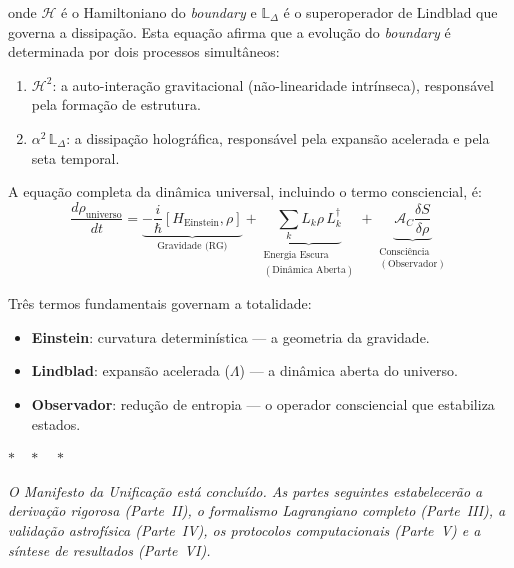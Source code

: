 \documentclass[12pt,a4paper,twoside]{article}
\newcommand{\alphaii}{\alpha^{2}}
\newcommand{\boundary}{\textit{boundary}}
\begin{document}
\noindent onde $\mathcal{H}$ \'e o Hamiltoniano do \boundary{} e $\mathbb{L}_\Delta$ \'e o superoperador de Lindblad que governa a dissipa\c{c}\~ao. Esta equa\c{c}\~ao afirma que a evolu\c{c}\~ao do \boundary{} \'e determinada por dois processos simult\^aneos:

\begin{enumerate}[nosep]
\item $\mathcal{H}^2$: a auto-intera\c{c}\~ao gravitacional (n\~ao-linearidade intr\'inseca), respons\'avel pela forma\c{c}\~ao de estrutura.
\item $\alphaii\,\mathbb{L}_\Delta$: a dissipa\c{c}\~ao hologr\'afica, respons\'avel pela expans\~ao acelerada e pela seta temporal.
\end{enumerate}

A equa\c{c}\~ao completa da din\^amica universal, incluindo o termo consciencial, \'e:
\begin{equation}
\frac{d\rho_{\text{universo}}}{dt} = \underbrace{-\frac{i}{\hbar}[H_{\text{Einstein}}, \rho]}_{\text{Gravidade (RG)}} + \underbrace{\sum_k L_k\rho\, L_k^\dagger}_{\substack{\text{Energia Escura}\\(\text{Din\^amica Aberta})}} + \underbrace{\mathcal{A}_C\frac{\delta S}{\delta\rho}}_{\substack{\text{Consci\^encia}\\(\text{Observador})}}
\label{eq:unificada}
\end{equation}

Tr\^es termos fundamentais governam a totalidade:
\begin{itemize}[nosep]
\item \textbf{Einstein}: curvatura determin\'istica --- a geometria da gravidade.
\item \textbf{Lindblad}: expans\~ao acelerada ($\Lambda$) --- a din\^amica aberta do universo.
\item \textbf{Observador}: redu\c{c}\~ao de entropia --- o operador consciencial que estabiliza estados.
\end{itemize}

\bigskip
\begin{center}
$\ast\quad\ast\quad\ast$
\end{center}
\bigskip

\noindent\textit{O Manifesto da Unifica\c{c}\~ao est\'a conclu\'ido. As partes seguintes estabelecer\~ao a deriva\c{c}\~ao rigorosa (Parte~II), o formalismo Lagrangiano completo (Parte~III), a valida\c{c}\~ao astrof\'isica (Parte~IV), os protocolos computacionais (Parte~V) e a s\'intese de resultados (Parte~VI).}
\end{document}
